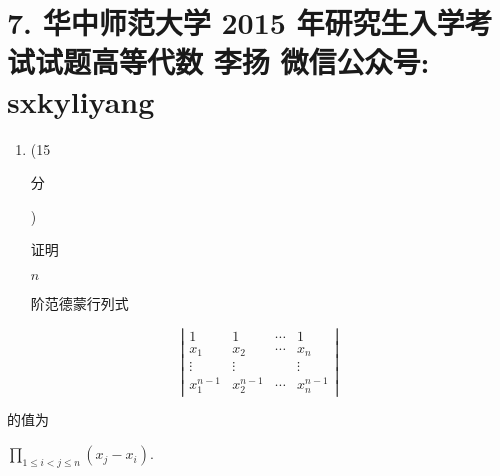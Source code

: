 \documentclass[10pt]{article}
\begin{document}
\section{7. 华中师范大学 2015 年研究生入学考试试题高等代数 
 李扬 
 微信公众号: sxkyliyang}
\begin{enumerate}
  \item (15 \begin{CJK}{UTF8}{mj}分\end{CJK}) \begin{CJK}{UTF8}{mj}证明\end{CJK} $n$ \begin{CJK}{UTF8}{mj}阶范德蒙行列式\end{CJK}
\end{enumerate}
$$
\left|\begin{array}{cccc}
1 & 1 & \cdots & 1 \\
x_{1} & x_{2} & \cdots & x_{n} \\
\vdots & \vdots & & \vdots \\
x_{1}^{n-1} & x_{2}^{n-1} & \cdots & x_{n}^{n-1}
\end{array}\right|
$$
\begin{CJK}{UTF8}{mj}的值为\end{CJK} $\prod_{1 \leqslant i<j \leqslant n}\left(x_{j}-x_{i}\right)$.
\end{document}
